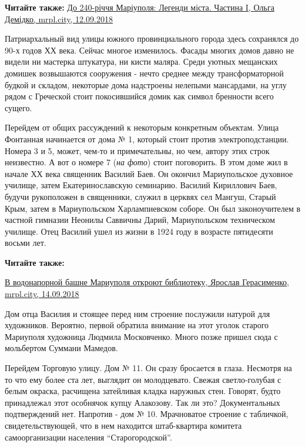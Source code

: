 \textbf{Читайте также:} \href{https://mrpl.city/blogs/view/do-240-richchya-mariupolya-legendi-mista-chastina-i}{%
До 240-річчя Маріуполя: Легенди міста. Частина I, Ольга Демідко, mrpl.city, 12.09.2018}

Патриархальный вид улицы южного провинциального города здесь сохранялся до 90-х
годов ХХ века. Сейчас многое изменилось. Фасады многих домов давно не видели ни
мастерка штукатура, ни кисти маляра. Среди уютных мещанских домишек возвышаются
сооружения - нечто среднее между трансформаторной будкой и складом, некоторые
дома надстроены нелепыми мансардами, на углу рядом с Греческой стоит
покосившийся домик как символ бренности всего сущего.


Перейдем от общих рассуждений к некоторым конкретным объектам. Улица Фонтанная
начинается от дома № 1, который стоит против электроподстанции. Номера 3 и 5,
может, чем-то и примечательны, но чем, автору этих строк неизвестно. А вот о
номере 7 (\emph{на фото}) стоит поговорить. В этом доме жил в начале ХХ века священник
Василий Баев. Он окончил Мариупольское духовное училище, затем
Екатеринославскую семинарию. Василий Кириллович Баев, будучи рукоположен в
священники, служил в церквях сел Мангуш, Старый Крым, затем в Мариупольском
Харлампиевском соборе. Он был законоучителем в частной гимназии Неонилы
Саввичны Дарий, Мариупольском техническом училище. Отец Василий ушел из жизни в
1924 году в возрасте пятидесяти восьми лет.

\textbf{Читайте также:} 

\href{https://mrpl.city/news/view/v-vodonapornoj-bashne-mariupolya-otkroyut-biblioteku-foto}{%
В водонапорной башне Мариуполя откроют библиотеку, Ярослав Герасименко, mrpl.city, 14.09.2018}

Дом отца Василия и стоящее перед ним строение послужили натурой для художников.
Вероятно, первой обратила внимание на этот уголок старого Мариуполя художница
Людмила Московченко. Много позже пришел сюда с мольбертом Суммани Мамедов.


Перейдем Торговую улицу. Дом № 11. Он сразу бросается в глаза. Несмотря на то
что ему более ста лет, выглядит он молодцевато. Свежая светло-голубая с белым
окраска, расчищена затейливая кладка наружных стен. Говорят, будто принадлежал
этот особнячок купцу Алакозову. Так ли это? Документальных подтверждений нет.
Напротив - дом № 10. Мрачноватое строение с табличкой, свидетельствующей, что в
нем находится штаб-квартира комитета самоорганизации населения
\enquote{Старогородской}.

